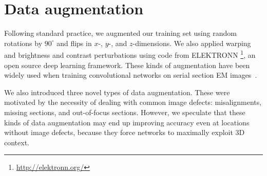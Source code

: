\documentclass{article}
\begin{document}

\section{Data augmentation}
\label{augmentation}

Following standard practice, we augmented our training set using random
rotations by $90^\circ$ and flips in $x$-, $y$-, and $z$-dimensions. We also
applied warping and brightness and contrast perturbations using code from
ELEKTRONN \footnote{\url{http://elektronn.org/}}, an open source deep learning
framework. These kinds of augmentation have been widely used when training
convolutional networks on serial section EM
images~\cite{zeng2017,ronneberger2015,beier2017,quan2016}.

We also introduced three novel types of data augmentation. These were motivated
by the necessity of dealing with common image defects: misalignments, missing
sections, and out-of-focus sections. However, we speculate that these kinds of
data augmentation may end up improving accuracy even at locations without image
defects, because they force networks to maximally exploit 3D context.

\end{document}
